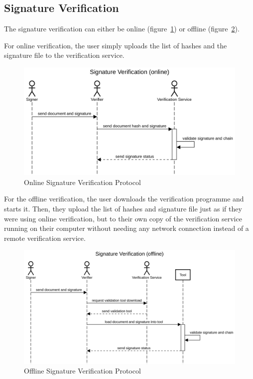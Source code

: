 \subsection{Signature Verification}\label{subsec:signature-verification}

The signature verification can either be online (figure~\ref{fig:onlinesignatureverificationprotocol})
or offline (figure~\ref{fig:offlinesignatureverificationprotocol}).

For online verification, the user simply uploads the list of hashes and the signature file to the verification service.

\begin{figure}[H]
    \begin{center}
        \includegraphics[scale=0.5]{images/protocol_online_verification_high_level.png}
        \caption{Online Signature Verification Protocol}
        \label{fig:onlinesignatureverificationprotocol}
    \end{center}
\end{figure}

For the offline verification, the user downloads the verification programme and starts it.
Then, they upload the list of hashes and signature file just as if they were using online verification,
but to their own copy of the verification service running on their computer without needing any network connection
instead of a remote verification service.

\begin{figure}[H]
    \begin{center}
        \includegraphics[scale=0.5]{images/protocol_offline_verification_high_level.png}
        \caption{Offline Signature Verification Protocol}
        \label{fig:offlinesignatureverificationprotocol}
    \end{center}
\end{figure}
\pagebreak

